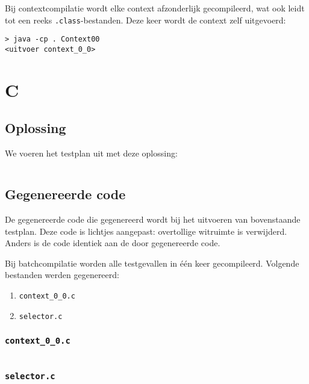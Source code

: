 Bij contextcompilatie wordt elke context afzonderlijk gecompileerd, wat ook leidt tot een reeks \texttt{.class}-bestanden.
Deze keer wordt de context zelf uitgevoerd:

\begin{verbatim}
> java -cp . Context00
<uitvoer context_0_0>
\end{verbatim}

\section{C}\label{sec:echo-function-c}

\subsection{Oplossing}\label{subsec:echo-function-oplossing}

We voeren het testplan uit met deze oplossing:

\inputminted{c}{sources/echo-function/correct.c}

\subsection{Gegenereerde code}\label{subsec:echo-function-c-gegenereerde-code}

De gegenereerde code die gegenereerd wordt bij het uitvoeren van bovenstaande testplan.
Deze code is lichtjes aangepast: overtollige witruimte is verwijderd.
Anders is de code identiek aan de door \tested{} gegenereerde code.

Bij batchcompilatie worden alle testgevallen in één keer gecompileerd.
Volgende bestanden werden gegenereerd:

\begin{enumerate}
    \item \texttt{context\_0\_0.c}
    \item \texttt{selector.c}
\end{enumerate}

\subsubsection{\texttt{context\_0\_0.c}}

\inputminted{c}{sources/echo-function/context_0_0.c}

\subsubsection{\texttt{selector.c}}


